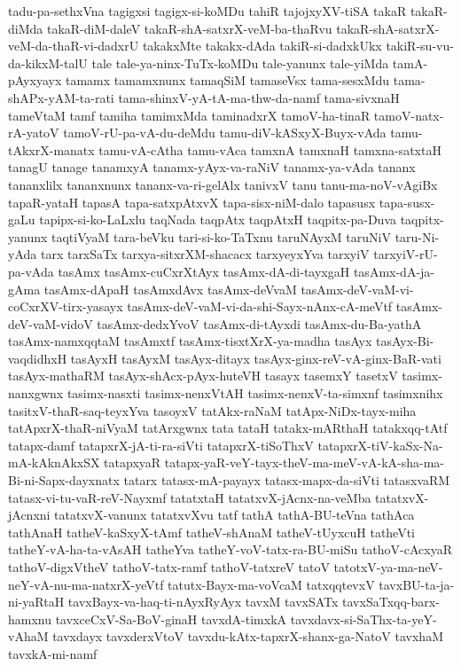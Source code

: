 {tadu-pa-sethxVna
tagigxsi
tagigx-si-koMDu
tahiR
tajojxyXV-tiSA
takaR
takaR-diMda
takaR-diM-daleV
takaR-shA-satxrX-veM-ba-thaRvu
takaR-shA-satxrX-veM-da-thaR-vi-dadxrU
takakxMte
takakx-dAda
takiR-si-dadxkUkx
takiR-su-vu-da-kikxM-talU
tale
tale-ya-ninx-TuTx-koMDu
tale-yanunx
tale-yiMda
tamA-pAyxyayx
tamamx
tamamxnunx
tamaqSiM
tamaseVsx
tama-sesxMdu
tama-shAPx-yAM-ta-rati
tama-shinxV-yA-tA-ma-thw-da-namf
tama-sivxnaH
tameVtaM
tamf
tamiha
tamimxMda
taminadxrX
tamoV-ha-tinaR
tamoV-natx-rA-yatoV
tamoV-rU-pa-vA-du-deMdu
tamu-diV-kASxyX-Buyx-vAda
tamu-tAkxrX-manatx
tamu-vA-cAtha
tamu-vAca
tamxnA
tamxnaH
tamxna-satxtaH
tanagU
tanage
tanamxyA
tanamx-yAyx-va-raNiV
tanamx-ya-vAda
tananx
tananxlilx
tananxnunx
tananx-va-ri-gelAlx
tanivxV
tanu
tanu-ma-noV-vAgiBx
tapaR-yataH
tapasA
tapa-satxpAtxvX
tapa-sisx-niM-dalo
tapasusx
tapa-susx-gaLu
tapipx-si-ko-LaLxlu
taqNada
taqpAtx
taqpAtxH
taqpitx-pa-Duva
taqpitx-yanunx
taqtiVyaM
tara-beVku
tari-si-ko-TaTxnu
taruNAyxM
taruNiV
taru-Ni-yAda
tarx
tarxSaTx
tarxya-sitxrXM-shacacx
tarxyeyxYva
tarxyiV
tarxyiV-rU-pa-vAda
tasAmx
tasAmx-cuCxrXtAyx
tasAmx-dA-di-tayxgaH
tasAmx-dA-ja-gAma
tasAmx-dApaH
tasAmxdAvx
tasAmx-deVvaM
tasAmx-deV-vaM-vi-coCxrXV-tirx-yasayx
tasAmx-deV-vaM-vi-da-shi-Sayx-nAnx-cA-meVtf
tasAmx-deV-vaM-vidoV
tasAmx-dedxYvoV
tasAmx-di-tAyxdi
tasAmx-du-Ba-yathA
tasAmx-namxqqtaM
tasAmxtf
tasAmx-tisxtXrX-ya-madha
tasAyx
tasAyx-Bi-vaqdidhxH
tasAyxH
tasAyxM
tasAyx-ditayx
tasAyx-ginx-reV-vA-ginx-BaR-vati
tasAyx-mathaRM
tasAyx-shAcx-pAyx-huteVH
tasayx
tasemxY
tasetxV
tasimx-nanxgwnx
tasimx-nasxti
tasimx-nenxVtAH
tasimx-nenxV-ta-simxnf
tasimxnihx
tasitxV-thaR-saq-teyxYva
tasoyxV
tatAkx-raNaM
tatApx-NiDx-tayx-miha
tatApxrX-thaR-niVyaM
tatArxgwnx
tata
tataH
tatakx-mARthaH
tatakxqq-tAtf
tatapx-damf
tatapxrX-jA-ti-ra-siVti
tatapxrX-tiSoThxV
tatapxrX-tiV-kaSx-Na-mA-kAknAkxSX
tatapxyaR
tatapx-yaR-veY-tayx-theV-ma-meV-vA-kA-sha-ma-Bi-ni-Sapx-dayxnatx
tatarx
tatasx-mA-payayx
tatasx-mapx-da-siVti
tatasxvaRM
tatasx-vi-tu-vaR-reV-Nayxmf
tatatxtaH
tatatxvX-jAcnx-na-veMba
tatatxvX-jAcnxni
tatatxvX-vanunx
tatatxvXvu
tatf
tathA
tathA-BU-teVna
tathAca
tathAnaH
tatheV-kaSxyX-tAmf
tatheV-shAnaM
tatheV-tUyxcuH
tatheVti
tatheY-vA-ha-ta-vAsAH
tatheYva
tatheY-voV-tatx-ra-BU-miSu
tathoV-cAcxyaR
tathoV-digxVtheV
tathoV-tatx-ramf
tathoV-tatxreV
tatoV
tatotxV-ya-ma-neV-neY-vA-nu-ma-natxrX-yeVtf
tatutx-Bayx-ma-voVcaM
tatxqqtevxV
tavxBU-ta-ja-ni-yaRtaH
tavxBayx-va-haq-ti-nAyxRyAyx
tavxM
tavxSATx
tavxSaTxqq-barx-hamxnu
tavxceCxV-Sa-BoV-ginaH
tavxdA-timxkA
tavxdavx-si-SaThx-ta-yeY-vAhaM
tavxdayx
tavxderxVtoV
tavxdu-kAtx-tapxrX-shanx-ga-NatoV
tavxhaM
tavxkA-mi-namf
}
